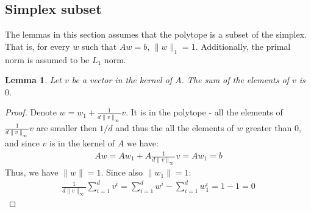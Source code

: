 \documentclass[10pt]{article}
\newtheorem{lemma}[theorem]{Lemma}
\theoremstyle{definition}
\theoremstyle{remark}
\begin{document}
\subsection{Simplex subset}
The lemmas in this section assumes that the polytope is a subset of the simplex. That is, for every $w$ such that $Aw=b$, $\|w\|_1=1$. Additionally, the primal norm is assumed to be $L_1$ norm.

\begin{lemma} \label{lem:sum elem ker}
Let $v$ be a vector in the kernel of $A$. The sum of the elements of $v$ is $0$.
\end{lemma}
\begin{proof}
Denote $w=w_1+\frac{1}{d\|v\|_{\infty}}v$. It is in the polytope - all the elements of $\frac{1}{d\|v\|_{\infty}}v$ are smaller then $1/d$ and thus the all the elements of $w$ greater than $0$, and since $v$ is in the kernel of $A$ we have:
\begin{align*}
    Aw = Aw_1+A\frac{1}{d\|v\|_{\infty}}v = Aw_1 = b
\end{align*}
Thus, we have $\|w\|=1$. Since also $\|w_1\|=1$:
\begin{align*}
    \frac{1}{d\|v\|_{\infty}}\sum_{i=1}^dv^i = \sum_{i=1}^dw^i - \sum_{i=1}^dw_1^i = 1 - 1 = 0
\end{align*}
\end{proof}
\end{document}
